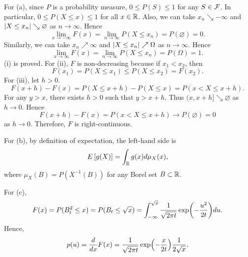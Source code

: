 \begin{solution}
    For (a), since $P$ is a probability measure, $0\leq P(S)\leq 1$ for any $S\in\mathcal{F}$. 
    In particular, $0\leq P(X\leq x)\leq 1$ for all $x\in\mathbb{R}$. Also, we can take 
    $x_n\searrow-\infty$ and $\left\lvert {X\leq x_n} \right\rvert\searrow\varnothing$ as $n\to\infty$. 
    Hence 
    \begin{equation*}
        \lim_{x\to-\infty} F(x) = \lim_{n\to\infty} P(X\leq x_n) = P(\varnothing) = 0.
    \end{equation*} 
    Similarly, we can take $x_n\nearrow\infty$ and $\left\lvert {X\leq x_n} \right\rvert\nearrow\Omega$ as
    $n\to\infty$. Hence
    \begin{equation*}
        \lim_{x\to\infty} F(x) = \lim_{n\to\infty} P(X\leq x_n) = P(\Omega) = 1.
    \end{equation*}
    (i) is proved. For (ii), $F$ is non-decreasing because if $x_1 < x_2$, then 
    \begin{equation*}
        F(x_1) = P(X\leq x_1) \leq P(X\leq x_2) = F(x_2).
    \end{equation*}
    For (iii), let $h>0$. 
    \begin{equation*}
        F(x+h) - F(x) = P(X\leq x+h) - P(X\leq x) = P(x < X \leq x+h).
    \end{equation*}
    For any $y>x$, there exists $h>0$ such that $y > x+h$. Thus $(x, x+h]\searrow\varnothing$ as $h\to 0$. 
    Hence 
    \begin{equation*}
        F(x+h) - F(x) = P(x < X \leq x+h) \to P(\varnothing) = 0
    \end{equation*}
    as $h\to 0$. Therefore, $F$ is right-continuous.

    For (b), by definition of expectation, the left-hand side is
    \begin{equation*}
        E\left[ {g(X)} \right] = \int_{\mathbb{R}} g(x) d\mu_X(x), 
    \end{equation*}
    where $\mu_X(B) = P(X^{-1}(B))$ for any Borel set $B\subset\mathbb{R}$.

    For (c), 
    \begin{equation*}
        F(x) = P(B_t^2\leq x) = P(B_t \leq \sqrt{x}) = \int_{-\infty}^{\sqrt{x}} \frac{1}{\sqrt{2\pi t}}\exp\pth{-\frac{u^2}{2t}} du.
    \end{equation*}
    Hence, 
    \begin{equation*}
        p(u) = \od{}{x}F(x) = \frac{1}{\sqrt{2\pi t}}\exp\pth{-\frac{x}{2t}}\frac{1}{2\sqrt{x}}.
    \end{equation*}
\end{solution}

